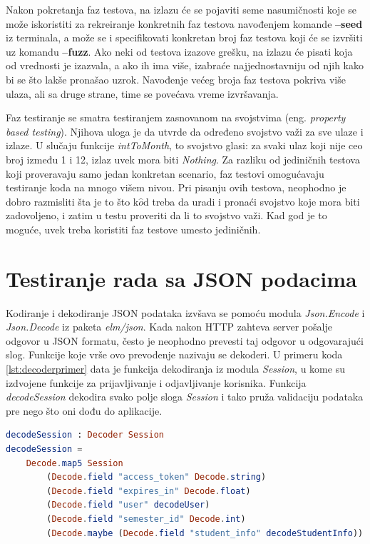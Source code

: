 \documentclass[12pt,oneside]{memoir}
\begin{document}
\par Nakon pokretanja faz testova, na izlazu će se pojaviti seme nasumičnosti koje se može iskoristiti za rekreiranje konkretnih faz testova navođenjem komande \textbf{--seed} iz terminala, a može se i specifikovati konkretan broj faz testova koji će se izvršiti uz komandu \textbf{--fuzz}. Ako neki od testova izazove grešku, na izlazu će pisati koja od vrednosti je izazvala, a ako ih ima više, izabraće najjednostavniju od njih kako bi se što lakše pronašao uzrok. Navođenje većeg broja faz testova pokriva više ulaza, ali sa druge strane, time se povećava vreme izvršavanja. 
\par Faz testiranje se smatra testiranjem zasnovanom na svojstvima (eng. \emph{property based testing}). Njihova uloga je da utvrde da određeno svojstvo važi za sve ulaze i izlaze. U slučaju funkcije \emph{intToMonth}, to svojstvo glasi: za svaki ulaz koji nije ceo broj između 1 i 12, izlaz uvek mora biti \emph{Nothing}. Za razliku od jediničnih testova koji proveravaju samo jedan konkretan scenario, faz testovi omogućavaju testiranje koda na mnogo višem nivou. Pri pisanju ovih testova, neophodno je dobro razmisliti šta je to što k$\hat{o}$d treba da uradi i pronaći svojstvo koje mora biti zadovoljeno, i zatim u testu proveriti da li to svojstvo važi. Kad god je to moguće, uvek treba koristiti faz testove umesto jediničnih. 

\section{Testiranje rada sa JSON podacima}
\par Kodiranje i dekodiranje JSON podataka izvšava se pomoću modula \emph{Json.Encode} i \emph{Json.Decode} iz paketa \emph{elm/json}. Kada nakon HTTP zahteva server pošalje odgovor u JSON formatu, često je neophodno prevesti taj odgovor u odgovarajući slog. Funkcije koje vrše ovo prevođenje nazivaju se dekoderi. U primeru koda \ref{lst:decoderprimer} data je funkcija dekodiranja iz modula \emph{Session}, u kome su izdvojene funkcije za prijavljivanje i odjavljivanje korisnika. Funkcija \emph{decodeSession} dekodira svako polje sloga \emph{Session} i tako pruža validaciju podataka pre nego što oni dođu do aplikacije. 

\begin{lstlisting}[language=elm, caption={Implementacija funkcije dekodiranja \emph{decodeSession}},captionpos=b, label={lst:decoderprimer}]
decodeSession : Decoder Session
decodeSession =
    Decode.map5 Session
        (Decode.field "access_token" Decode.string)
        (Decode.field "expires_in" Decode.float)
        (Decode.field "user" decodeUser)
        (Decode.field "semester_id" Decode.int)
        (Decode.maybe (Decode.field "student_info" decodeStudentInfo))
\end{lstlisting}
\end{document}
